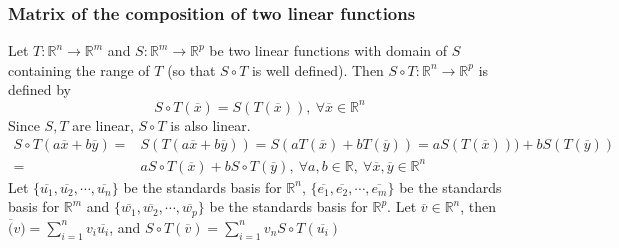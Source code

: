 \subsubsection{Matrix of the composition of two linear functions}
	Let $T : \mathbb{R}^n \to \mathbb{R}^m$ and $S : \mathbb{R}^m \to \mathbb{R}^p$ be two linear functions with domain of $S$ containing the range of $T$ (so that $S \circ T$ is well defined).
	Then $S \circ T : \mathbb{R}^n \to \mathbb{R}^p$ is defined by
	\[ S \circ T(\overline{x}) = S(T(\overline{x})),\ \forall \overline{x} \in \mathbb{R}^n\]
	Since $S,T$ are linear, $S \circ T$ is also linear.
	\begin{align*}
		S \circ T(a \overline{x} + b \overline{y}) = & S(T(a \overline{x} + b\overline{y})) = S(a T(\overline{x}) + b T(\overline{y})) = a S(T(\overline{x}))) + b S(T(\overline{y})) \\
		= & a S \circ T(\overline{x}) + b S \circ T(\overline{y}),\ \forall a,b \in \mathbb{R},\ \forall \overline{x},\overline{y} \in \mathbb{R}^n
	\end{align*}
	Let $\{\overline{u_1},\overline{u_2},\cdots,\overline{u_n}\}$ be the standards basis for $\mathbb{R}^n$, $\{\overline{e_1},\overline{e_2},\cdots,\overline{e_m}\}$ be the standards basis for $\mathbb{R}^m$ and $\{\overline{w_1},\overline{w_2},\cdots,\overline{w_p}\}$ be the standards basis for $\mathbb{R}^p$.
	Let $\overline{v} \in \mathbb{R}^n$, then $\overline(v) = \sum_{i=1}^n v_i\overline{u_i}$, and $S \circ T(\overline{v})=\sum_{i=1}^n v_n S \circ T(\overline{u_i})$

